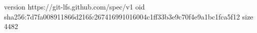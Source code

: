 version https://git-lfs.github.com/spec/v1
oid sha256:7d7fa008911866d216fc267416991016004c1ff33b3e9c70f4e9a1bc1fca5f12
size 4482
